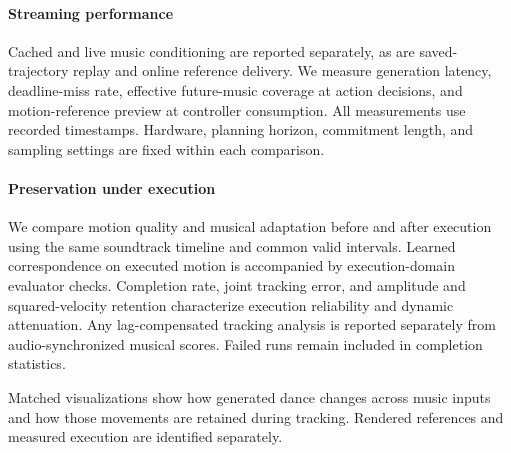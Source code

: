 \paragraph{Streaming performance}
Cached and live music conditioning are reported separately,
as are saved-trajectory replay and online reference delivery.
We measure generation latency, deadline-miss rate,
effective future-music coverage at action decisions,
and motion-reference preview at controller consumption.
All measurements use recorded timestamps.
Hardware, planning horizon, commitment length, and sampling
settings are fixed within each comparison.

\paragraph{Preservation under execution}
We compare motion quality and musical adaptation before
and after execution using the same soundtrack timeline
and common valid intervals.
Learned correspondence on executed motion is accompanied
by execution-domain evaluator checks.
Completion rate, joint tracking error, and amplitude
and squared-velocity retention characterize execution
reliability and dynamic attenuation.
Any lag-compensated tracking analysis is reported
separately from audio-synchronized musical scores.
Failed runs remain included in completion statistics.

Matched visualizations show how generated dance changes
across music inputs and how those movements are retained
during tracking.
Rendered references and measured execution are identified
separately.

